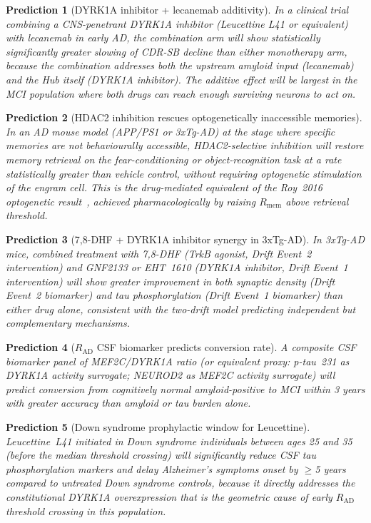\documentclass[12pt,a4paper]{article}
\newtheorem{prediction}{Prediction}
\newcommand{\RAD}{R_{\mathrm{AD}}}
\newcommand{\RMEM}{R_{\mathrm{mem}}}
\begin{document}
\begin{prediction}[DYRK1A inhibitor + lecanemab
additivity]
\label{pred:combo}
In a clinical trial combining a CNS-penetrant DYRK1A
inhibitor (Leucettine L41 or equivalent) with lecanemab
in early AD, the combination arm will show statistically
significantly greater slowing of CDR-SB decline than
either monotherapy arm, because the combination addresses
both the upstream amyloid input (lecanemab) and the
Hub itself (DYRK1A inhibitor). The additive effect
will be largest in the MCI population where both
drugs can reach enough surviving neurons to act on.
\end{prediction}

\begin{prediction}[HDAC2 inhibition rescues
optogenetically inaccessible memories]
\label{pred:hdac2}
In an AD mouse model (APP/PS1 or 3xTg-AD) at the
stage where specific memories are not behaviourally
accessible, HDAC2-selective inhibition will restore
memory retrieval on the fear-conditioning or
object-recognition task at a rate statistically greater
than vehicle control, without requiring optogenetic
stimulation of the engram cell. This is the
drug-mediated equivalent of the Roy~2016 optogenetic
result~\cite{Roy2016}, achieved pharmacologically
by raising $\RMEM$ above retrieval threshold.
\end{prediction}

\begin{prediction}[7,8-DHF + DYRK1A inhibitor
synergy in 3xTg-AD]
\label{pred:trkb}
In 3xTg-AD mice, combined treatment with 7,8-DHF
(TrkB agonist, Drift Event~2 intervention) and
GNF2133 or EHT~1610 (DYRK1A inhibitor, Drift
Event~1 intervention) will show greater improvement
in both synaptic density (Drift Event~2 biomarker)
and tau phosphorylation (Drift Event~1 biomarker)
than either drug alone, consistent with the two-drift
model predicting independent but complementary
mechanisms.
\end{prediction}

\begin{prediction}[$\RAD$ CSF biomarker predicts
conversion rate]
\label{pred:iad}
A composite CSF biomarker panel of MEF2C/DYRK1A ratio
(or equivalent proxy: p-tau~231 as DYRK1A activity
surrogate; NEUROD2 as MEF2C activity surrogate) will
predict conversion from cognitively normal amyloid-positive
to MCI within 3 years with greater accuracy than
amyloid or tau burden alone.
\end{prediction}

\begin{prediction}[Down syndrome prophylactic window
for Leucettine]
\label{pred:ds}
Leucettine~L41 initiated in Down syndrome individuals
between ages 25 and 35 (before the median threshold
crossing) will significantly reduce CSF tau
phosphorylation markers and delay Alzheimer's
symptoms onset by $\geq$5 years compared to untreated
Down syndrome controls, because it directly addresses
the constitutional DYRK1A overexpression that is
the geometric cause of early $\RAD$ threshold
crossing in this population.
\end{prediction}
\end{document}
